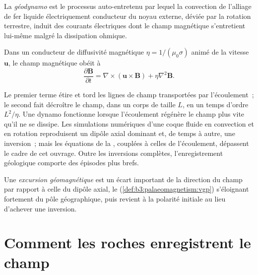 \begin{definition}[Géodynamo]\label{def:b3:palaeomagnetism:geodynamo}
La \emph{géodynamo} est le processus auto-entretenu par lequel la
convection de l'alliage de fer liquide électriquement conducteur du noyau externe,
déviée par la rotation terrestre, induit des courants électriques dont le champ
magnétique s'entretient lui-même malgré la dissipation ohmique.
\end{definition}

\begin{proposition}\label{prop:b3:palaeomagnetism:induction}
Dans un conducteur de diffusivité magnétique $\eta = 1/(\mu_0\sigma)$ animé de la
vitesse $\mathbf u$, le champ magnétique obéit à
\[
  \frac{\partial\mathbf B}{\partial t} = \nabla\times(\mathbf u\times\mathbf B)
  + \eta\nabla^2\mathbf B .
\]
\end{proposition}
\admitted

Le premier terme étire et tord les lignes de champ transportées par l'écoulement~; le
second fait décroître le champ, dans un corps de taille $L$, en un temps d'ordre
$L^2/\eta$. Une dynamo fonctionne lorsque l'écoulement régénère le champ plus vite qu'il ne
se dissipe. Les simulations numériques d'une coque fluide en convection et en rotation
reproduisent un dipôle axial dominant et, de temps à autre, une inversion~; mais les
équations de la , couplées à celles de l'écoulement, dépassent le
cadre de cet ouvrage. Outre les inversions complètes, l'enregistrement géologique comporte des épisodes plus brefs.

\begin{definition}\label{def:b3:palaeomagnetism:excursion}
Une \emph{excursion géomagnétique} est un écart
important de la direction du champ par rapport à celle du dipôle axial, le
 (\cref{def:b3:palaeomagnetism:vgp}) s'éloignant fortement
du pôle géographique, puis revient à la polarité initiale au lieu
d'achever une inversion.
\end{definition}

\section{Comment les roches enregistrent le champ}

